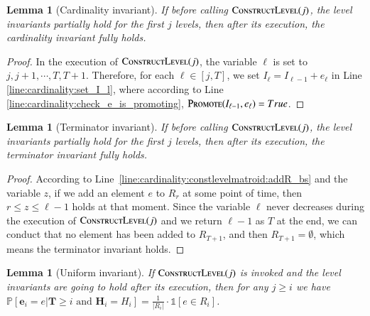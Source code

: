 \documentclass[11pt]{article}
\newtheorem{lemma}[theorem]{Lemma}
\renewcommand{\Pr}[1]{\ensuremath{\mathbb{P}\left[#1\right]}}
\newcommand{\ind}[1]{\ensuremath{\mathds{1}\left[#1\right]}}
\newcommand{\constLevel}{\textsc{ConstructLevel}}
\newcommand{\replacementTester}{\textsc{Promote}}
\newcommand{\bE}{\ensuremath{\mathbf{e}}}
\newcommand{\bT}{\ensuremath{\mathbf{T}}}
\newcommand{\bH}{\ensuremath{\mathbf{H}}}
\begin{document}
\begin{lemma}[Cardinality invariant]
\label{lm:cardinality:cardinality:leveling}
If before calling $\constLevel{}(j)$, the level invariants partially hold for the first $j$ levels, 
then after its execution, the cardinality invariant fully holds. 
\end{lemma}

\begin{proof}
In the execution of $\constLevel{}(j)$, the variable $\ell$ is set to $j, j+1,\cdots, T,T+1$. Therefore, for each $\ell \in  [j,T]$, we set $I_{\ell} = I_{\ell-1} + e_\ell$ in Line \ref{line:cardinality:set_I_l}, where according to Line \ref{line:cardinality:check_e_is_promoting}, $\replacementTester(I_{\ell-1}, e_{\ell})=True$.
\end{proof}
\begin{lemma}[Terminator invariant]
\label{lm:cardinality:terminator:leveling}
If before calling $\constLevel{}(j)$, the level invariants partially hold for the first $j$ levels,
then after its execution, the terminator invariant fully holds. 
\end{lemma}

\begin{proof}
According to Line~\ref{line:cardinality:constlevelmatroid:addR_bs} and the variable $z$, if we add an element $e$ to $R_r$ at some point of time, then $r\leq z\leq \ell-1$ holds at that moment.
Since the variable $\ell$ never decreases during the execution of $\constLevel{}(j)$ and we return $\ell-1$ as $T$ at the end, we can conduct that no element has been added to  $R_{T+1}$, and then $R_{T+1}=\emptyset$, which means the terminator invariant holds. 
\end{proof}


\begin{lemma}[Uniform invariant]
\label{lm:cardinality:uniform:leveling}
If $\constLevel{}(j)$ is invoked and 
the level invariants are going to hold after its execution, then for any $j \ge i$ we have $ \Pr{\bE_i = e |  \bT \geq i \text{ and } \bH_i = H_i  }= \frac{1}{|R_i|}\cdot \ind{e\in R_i}  $.
\end{lemma}
\end{document}
